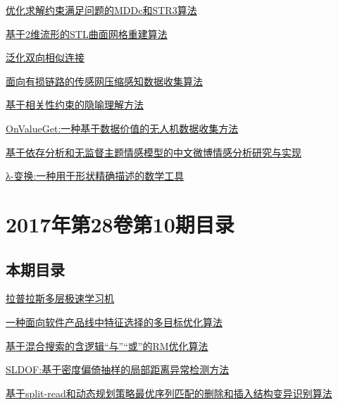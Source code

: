 \documentclass[a4paper]{article}
\begin{document}
\href{http://www.jos.org.cn/ch/reader/create_pdf.aspx?file_no=5242&year_id=2017&quarter_id=12&falg=1}{优化求解约束满足问题的MDDc和STR3算法}

\href{http://www.jos.org.cn/ch/reader/create_pdf.aspx?file_no=5243&year_id=2017&quarter_id=12&falg=1}{基于2维流形的STL曲面网格重建算法}

\href{http://www.jos.org.cn/ch/reader/create_pdf.aspx?file_no=5244&year_id=2017&quarter_id=12&falg=1}{泛化双向相似连接}

\href{http://www.jos.org.cn/ch/reader/create_pdf.aspx?file_no=5246&year_id=2017&quarter_id=12&falg=1}{面向有损链路的传感网压缩感知数据收集算法}

\href{http://www.jos.org.cn/ch/reader/create_pdf.aspx?file_no=5247&year_id=2017&quarter_id=12&falg=1}{基于相关性约束的隐喻理解方法}

\href{http://www.jos.org.cn/ch/reader/create_pdf.aspx?file_no=5248&year_id=2017&quarter_id=12&falg=1}{OnValueGet:一种基于数据价值的无人机数据收集方法}

\href{http://www.jos.org.cn/ch/reader/create_pdf.aspx?file_no=5283&year_id=2017&quarter_id=12&falg=1}{基于依存分析和无监督主题情感模型的中文微博情感分析研究与实现}

\href{http://www.jos.org.cn/ch/reader/create_pdf.aspx?file_no=5314&year_id=2017&quarter_id=12&falg=1}{λ-变换:一种用于形状精确描述的数学工具}


\section{\textbf{2017年第28卷第10期目录}}
\subsection{本期目录}
\href{http://www.jos.org.cn/ch/reader/create_pdf.aspx?file_no=5128&year_id=2017&quarter_id=10&falg=1}{拉普拉斯多层极速学习机}

\href{http://www.jos.org.cn/ch/reader/create_pdf.aspx?file_no=5130&year_id=2017&quarter_id=10&falg=1}{一种面向软件产品线中特征选择的多目标优化算法}

\href{http://www.jos.org.cn/ch/reader/create_pdf.aspx?file_no=5133&year_id=2017&quarter_id=10&falg=1}{基于混合搜索的含逻辑“与”“或”的RM优化算法}

\href{http://www.jos.org.cn/ch/reader/create_pdf.aspx?file_no=5134&year_id=2017&quarter_id=10&falg=1}{SLDOF:基于密度偏倚抽样的局部距离异常检测方法}

\href{http://www.jos.org.cn/ch/reader/create_pdf.aspx?file_no=5137&year_id=2017&quarter_id=10&falg=1}{基于split-read和动态规划策略最优序列匹配的删除和插入结构变异识别算法}
\end{document}
